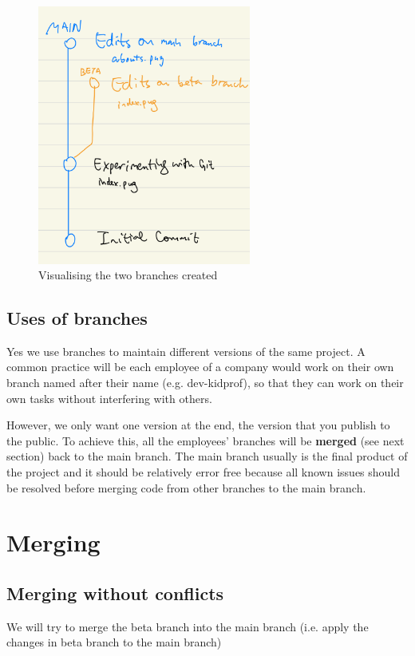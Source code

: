 \begin{figure}[h]
\centering
\includegraphics[width=7cm]{images/ch8-branching.png}
\caption{Visualising the two branches created}
\end{figure}

\subsection*{Uses of branches}
Yes we use branches to maintain different versions of the same project. A common practice will be each employee of a company would work on their own branch named after their name (e.g. dev-kidprof), so that they can work on their own tasks without interfering with others.

However, we only want one version at the end, the version that you publish to the public. To achieve this, all the employees' branches will be \textbf{merged} (see next section) back to the main branch. The main branch usually is the final product of the project and it should be relatively error free because all known issues should be resolved before merging code from other branches to the main branch.

\section{Merging}
\label{sec:merge}

\subsection{Merging without conflicts}

We will try to merge the beta branch into the main branch (i.e. apply the changes in beta branch to the main branch)


